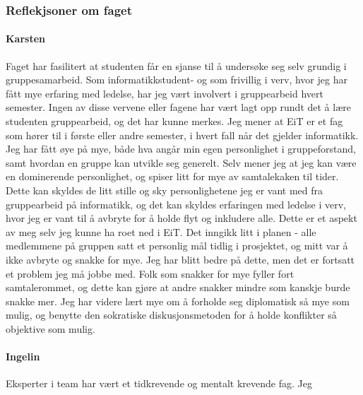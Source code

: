 \subsubsection{Reflekjsoner om faget}

\paragraph{Karsten}
Faget har fasilitert at studenten får en sjanse til å undersøke seg selv grundig i gruppesamarbeid. Som informatikkstudent- og som frivillig i verv, hvor jeg har fått mye erfaring med ledelse, har jeg vært involvert i gruppearbeid hvert semester. Ingen av disse vervene eller fagene har vært lagt opp rundt det å lære studenten gruppearbeid, og det har kunne merkes. Jeg mener at EiT er et fag som hører til i første eller andre semester, i hvert fall når det gjelder informatikk. Jeg har fått øye på mye, både hva angår min egen personlighet i gruppeforstand, samt hvordan en gruppe kan utvikle seg generelt. Selv mener jeg at jeg kan være en dominerende personlighet, og spiser litt for mye av samtalekaken til tider. Dette kan skyldes de litt stille og sky personlighetene jeg er vant med fra gruppearbeid på informatikk, og det kan skyldes erfaringen med ledelse i verv, hvor jeg er vant til å avbryte for å holde flyt og inkludere alle. Dette er et aspekt av meg selv jeg kunne ha roet ned i EiT. Det inngikk litt i planen - alle medlemmene på gruppen satt et personlig mål tidlig i prosjektet, og mitt var å ikke avbryte og snakke for mye. Jeg har blitt bedre på dette, men det er fortsatt et problem jeg må jobbe med. Folk som snakker for mye fyller fort samtalerommet, og dette kan gjøre at andre snakker mindre som kanskje burde snakke mer. Jeg har videre lært mye om å forholde seg diplomatisk så mye som mulig, og benytte den sokratiske diskusjonsmetoden for å holde konflikter så objektive som mulig. 

\paragraph{Ingelin}
Eksperter i team har vært et tidkrevende og mentalt krevende fag. Jeg 




